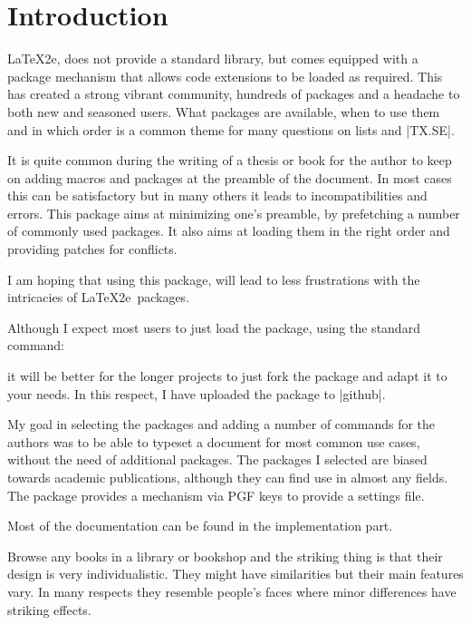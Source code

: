 \chapter{Introduction}

 \LaTeX2e, does not provide a standard library, but comes equipped with
 a package mechanism that allows code extensions to be loaded as required.
 This has created a strong vibrant community, hundreds of packages and a 
 headache to both new and seasoned users. What packages are available, when
 to use them and in which order is a common theme for many questions on
 lists and |TX.SE|.

 It is quite common during the writing of a thesis or book
 for the author to keep on adding macros and packages
 at the preamble of the document. In most cases this can
 be satisfactory but in many others it leads to
 incompatibilities and errors. This package aims at
 minimizing one's preamble, by prefetching a number of
 commonly used packages. It also aims at loading them
 in the right order and providing patches for conflicts.
 
 I am hoping that using this package, will lead to less
 frustrations with the intricacies of \LaTeX2e\ packages.

 Although I expect most users to just load the package, using
 the standard command:

 \begin{teX}
  \usepackage{phd}
 \end{teX}

 it will be better for the longer projects to just fork the
 package and adapt it to your needs. In this respect, I have
 uploaded the package to |github|.

 My goal in selecting the packages and adding a number of 
 commands for the authors was to be able to typeset a 
 document for most common use cases, without the need of
 additional packages. The packages I selected are biased
 towards academic publications, although they can find use
 in almost any fields. The package provides a mechanism via
 PGF keys to provide a settings file. 
 
 Most of the documentation can be found in the implementation part.

Browse any books in a library or bookshop and the striking thing is that their design is very individualistic. They might have similarities but their main features vary. In many respects they resemble people's faces where minor differences have striking effects.

